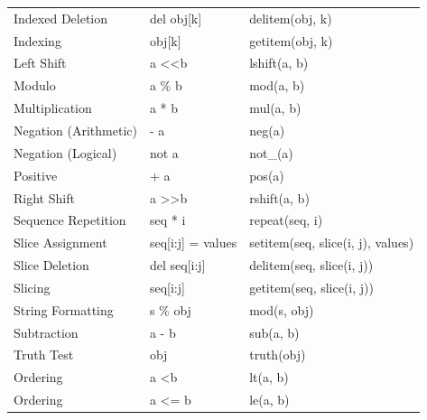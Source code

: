 \documentclass{l4proj}
\begin{document}
\begin{table}[]
\begin{tabular}{@{}lll@{}}
    Indexed Deletion      & del obj{[}k{]}                 & delitem(obj, k)                              \\
    Indexing              & obj{[}k{]}                     & getitem(obj, k)                              \\
    Left Shift            & a \textless{}\textless b       & lshift(a, b)                                 \\
    Modulo                & a \% b                         & mod(a, b)                                    \\
    Multiplication        & a * b                          & mul(a, b)                                    \\
    Negation (Arithmetic) & - a                            & neg(a)                                       \\
    Negation (Logical)    & not a                          & not\_(a)                                     \\
    Positive              & + a                            & pos(a)                                       \\
    Right Shift           & a \textgreater{}\textgreater b & rshift(a, b)                                 \\
    Sequence Repetition   & seq * i                        & repeat(seq, i)                               \\
    Slice Assignment      & seq{[}i:j{]} = values          & setitem(seq, slice(i, j), values)            \\
    Slice Deletion        & del seq{[}i:j{]}               & delitem(seq, slice(i, j))                    \\
    Slicing               & seq{[}i:j{]}                   & getitem(seq, slice(i, j))                    \\
    String Formatting     & s \% obj                       & mod(s, obj)                                  \\
    Subtraction           & a - b                          & sub(a, b)                                    \\
    Truth Test            & obj                            & truth(obj)                                   \\
    Ordering              & a \textless b                  & lt(a, b)                                     \\
    Ordering              & a \textless{}= b               & le(a, b)                                     \\

\end{tabular}
\end{table}
\end{document}
